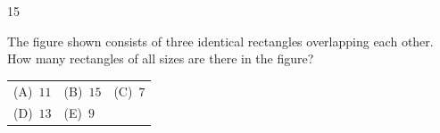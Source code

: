 \documentclass[11pt]{article}
\makeatletter
\newenvironment{probbox}[2]{\begin{probboxT}{#1}{#2}}{\end{probboxT}}
\newcommand{\choicesII}[5]{\par\smallskip\noindent
  \begin{tabularx}{\linewidth}{@{}XXX@{}}(A)\ #1&(B)\ #2&(C)\ #3\\(D)\ #4&(E)\ #5&\end{tabularx}\par}
\makeatother
\begin{document}
\begin{probbox}{15}{\relax}
\begin{minipage}[t]{0.52\linewidth}\vspace{0pt}
The figure shown consists of three identical rectangles overlapping each other. How many rectangles of all sizes are there in the figure?
\choicesII{$11$}{$15$}{$7$}{$13$}{$9$}
\end{minipage}\hfill
\begin{minipage}[t]{0.44\linewidth}\vspace{0pt}
\centering{}
\end{minipage}
\end{probbox}
\end{document}
